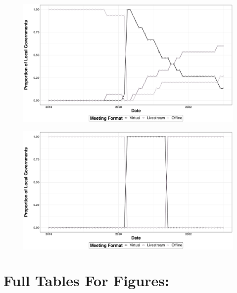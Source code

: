   \begin{figure}[H]
    \centering
     \par\medskip
    \includegraphics[scale=0.3]{Figures/SchoolAccess.pdf}
    \caption[Access to School Board Meetings From 2018-2022]{\footnotesize{}}
    \label{}
\end{figure}

\begin{figure}[H]
  \centering
   \par\medskip
  \includegraphics[scale=0.3]{Figures/CountyAccess.pdf}
  \caption[Access to County Council Meetings From 2018-2022]{\footnotesize{}}
  \label{}
\end{figure}




    \section{Full Tables For Figures:}
